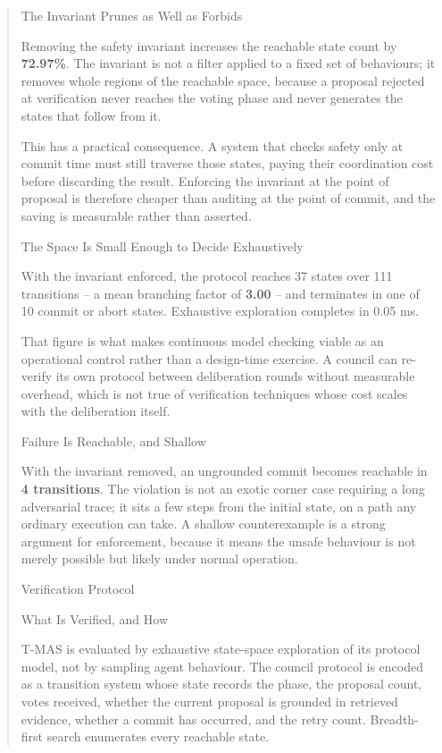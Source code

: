 \documentclass[10pt,journal,compsoc,twocolumn]{IEEEtran}
\begin{document}
\begin{quote}
{ The Invariant Prunes as Well as Forbids

Removing the safety invariant increases the reachable state count by
\textbf{72.97\%}. The invariant is not a filter
applied to a fixed set of behaviours; it removes whole regions of the reachable
space, because a proposal rejected at verification never reaches the voting phase
and never generates the states that follow from it.

This has a practical consequence. A system that checks safety only at commit time
must still traverse those states, paying their coordination cost before discarding
the result. Enforcing the invariant at the point of proposal is therefore cheaper
than auditing at the point of commit, and the saving is measurable rather than
asserted.

 The Space Is Small Enough to Decide Exhaustively

With the invariant enforced, the protocol reaches
37 states over 111
transitions -- a mean branching factor of
\textbf{3.00} -- and terminates in one of
10 commit or abort states. Exhaustive exploration
completes in 0.05 ms.

That figure is what makes continuous model checking viable as an operational
control rather than a design-time exercise. A council can re-verify its own
protocol between deliberation rounds without measurable overhead, which is not true
of verification techniques whose cost scales with the deliberation itself.

 Failure Is Reachable, and Shallow

With the invariant removed, an ungrounded commit becomes reachable in
\textbf{4 transitions}. The violation is
not an exotic corner case requiring a long adversarial trace; it sits a few steps
from the initial state, on a path any ordinary execution can take. A shallow
counterexample is a strong argument for enforcement, because it means the unsafe
behaviour is not merely possible but likely under normal operation.



 Verification Protocol

 What Is Verified, and How

T-MAS is evaluated by exhaustive state-space exploration of its protocol model, not by sampling agent behaviour. The council protocol is encoded as a transition system whose state records the phase, the proposal count, votes received, whether the current proposal is grounded in retrieved evidence, whether a commit has occurred, and the retry count. Breadth-first search enumerates every reachable state.

}
\end{quote}
\end{document}
